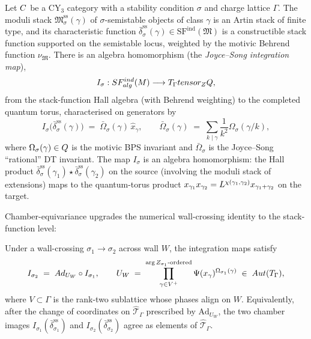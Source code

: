 \begin{theorem}
  \label{thm:joyce-song-integration}
  Let $C$ be a CY$_3$ category with a stability condition $\sigma$
  and charge lattice $\Gamma$. The moduli stack
  $\mathfrak{M}_\sigma^{\mathrm{ss}}(\gamma)$ of $\sigma$-semistable objects of
  class $\gamma$ is an Artin stack of finite type, and its characteristic
  function $\bar{\delta}_\sigma^{\mathrm{ss}}(\gamma) \in \mathrm{SF}^{\mathrm{ind}}(\mathfrak{M})$
  is a constructible stack function supported on the semistable locus,
  weighted by the motivic Behrend function
  $\nu_{\mathfrak{M}}$.
  There is an algebra homomorphism (the \emph{Joyce--Song integration
  map}),
  \[
    I_\sigma : SF^{ind}_{alg}(M) \longrightarrow T_\Gamma tensor_{Z} Q,
  \]
  from the stack-function Hall algebra (with Behrend weighting) to the
  completed quantum torus, characterised on generators by
  \[
    I_\sigma\!\big(\bar{\delta}_\sigma^{\mathrm{ss}}(\gamma)\big)
      \;=\; \bar{\Omega}_\sigma(\gamma)\, \hat{x}_\gamma,
    \qquad
    \bar{\Omega}_\sigma(\gamma) \;=\; \sum_{k \mid \gamma} \frac{1}{k^2} \Omega_\sigma(\gamma / k),
  \]
  where $\Omega_\sigma(\gamma) \in Q$ is the motivic BPS invariant and
  $\bar{\Omega}_\sigma$ is the Joyce--Song ``rational'' DT invariant. The
  map $I_\sigma$ is an algebra homomorphism: the Hall product
  $\bar{\delta}^{\mathrm{ss}}_\sigma(\gamma_1) \star \bar{\delta}^{\mathrm{ss}}_\sigma(\gamma_2)$
  on the source (involving the moduli stack of extensions) maps to the
  quantum-torus product $x_{\gamma_1} x_{\gamma_2} = L^{\chi(\gamma_1, \gamma_2)} x_{\gamma_1 + \gamma_2}$
  on the target.
\end{theorem}

Chamber-equivariance upgrades the numerical wall-crossing identity to
the stack-function level:

\begin{corollary}
  \label{cor:I-chamber-equivariance}
  Under a wall-crossing $\sigma_1 \to \sigma_2$ across wall $W$,
  the integration maps satisfy
  \[
    I_{\sigma_2} \;=\; Ad_{U_W} \circ I_{\sigma_1},
    \qquad
    U_W \;=\; \prod_{\gamma \in V^+}^{\arg Z_{\sigma_1}\text{-ordered}} \Psi(x_\gamma)^{\Omega_{\sigma_1}(\gamma)}
        \;\in\; Aut(T_\Gamma),
  \]
  where $V \subset \Gamma$ is the rank-two sublattice whose phases align
  on $W$. Equivalently, after the change of coordinates on $\hat{\mathcal{T}}_\Gamma$
  prescribed by $\mathrm{Ad}_{U_W}$, the two chamber images
  $I_{\sigma_1}(\bar{\delta}^{\mathrm{ss}}_{\sigma_1})$ and
  $I_{\sigma_2}(\bar{\delta}^{\mathrm{ss}}_{\sigma_2})$ agree as
  elements of $\hat{\mathcal{T}}_\Gamma$.
\end{corollary}

